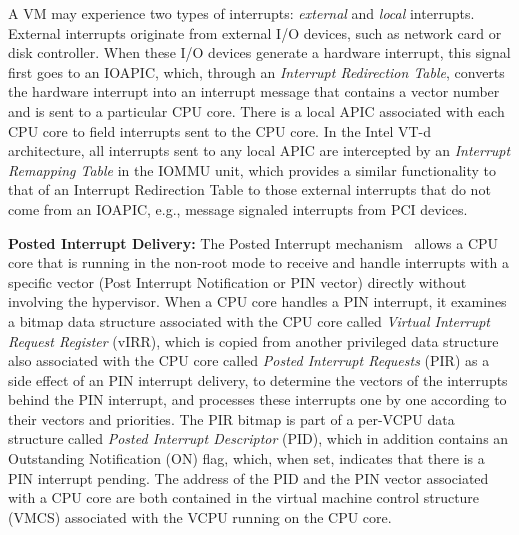 A VM may experience two types of interrupts: {\em external} and {\em local} interrupts.
External interrupts originate from external I/O devices, such as network card or disk controller.
When these I/O devices generate a hardware interrupt, this signal first goes to an IOAPIC, which, through an {\em Interrupt Redirection Table}, 
converts the hardware interrupt into an interrupt message that contains a vector number and is sent to a particular CPU core.
There is a local APIC associated with each CPU core to field interrupts sent to the CPU core.
In the Intel VT-d architecture, all interrupts sent to any local APIC are intercepted by  an {\em Interrupt Remapping Table} in the IOMMU unit, 
which provides a similar functionality to that of an Interrupt Redirection Table
to those external interrupts that do not come from an IOAPIC, e.g., message signaled interrupts from PCI devices.

{\bf Posted Interrupt Delivery:}
The Posted Interrupt mechanism~\cite{intelvtd-paper,intelvtd-manual} allows a CPU core that is running in the non-root mode to receive and handle interrupts with a specific vector
(Post Interrupt Notification or PIN vector) directly without involving the hypervisor.
When a CPU core handles a PIN interrupt, it examines a bitmap data structure associated with the CPU core called {\em Virtual Interrupt Request Register} (vIRR),
which is copied from another privileged data structure also associated with the CPU core called {\em Posted Interrupt Requests} (PIR) as a side effect of an PIN interrupt delivery,  
to determine the vectors of the interrupts behind the PIN interrupt, and processes these interrupts one by one according to their vectors and priorities.
The PIR bitmap is part of a per-VCPU data structure called {\em Posted Interrupt Descriptor} (PID), which in addition contains an Outstanding Notification (ON) flag, which, when set, indicates that there is a PIN interrupt pending.  
The address of the PID and the PIN vector associated with a CPU core are both contained in the virtual machine control structure (VMCS) associated with the VCPU running on the CPU core.

